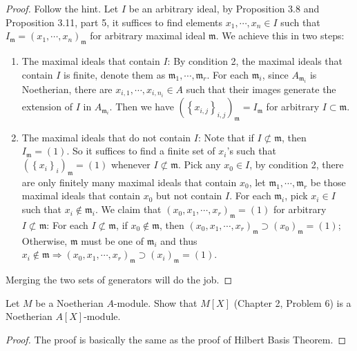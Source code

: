 \documentclass{solution}
\begin{document}
\begin{proof}
    Follow the hint. Let $I$ be an arbitrary ideal, by Proposition 3.8 and Proposition 3.11, part 5, it suffices to find elements $x_1, \cdots, x_n \in I$ such that $I_{\mathfrak{m}} = (x_1, \cdots, x_n)_{\mathfrak{m}}$ for arbitrary maximal ideal $\mathfrak{m}$. We achieve this in two steps:
    \begin{enumerate}
        \item The maximal ideals that contain $I$: By condition 2, the maximal ideals that contain $I$ is finite, denote them as $\mathfrak{m}_1, \cdots, \mathfrak{m}_r$. For each $\mathfrak{m}_i$, since $A_{\mathfrak{m}_i}$ is Noetherian, there are $x_{i, 1}, \cdots, x_{i, n_i} \in A$ such that their images generate the extension of $I$ in $A_{\mathfrak{m}_i}$. Then we have $(\left\lbrace x_{i, j} \right\rbrace_{i, j})_{\mathfrak{m}} = I_{\mathfrak{m}}$ for arbitrary $I \subset \mathfrak{m}$.
        \item The maximal ideals that do not contain $I$: Note that if $I \not \subset \mathfrak{m}$, then $I_{\mathfrak{m}} = (1)$. So it suffices to find a finite set of $x_i$'s such that $(\left\lbrace x_i \right\rbrace_i)_{\mathfrak{m}} = (1)$ whenever $I \not \subset \mathfrak{m}$. Pick any $x_0 \in I$, by condition 2, there are only finitely many maximal ideals that contain $x_0$, let $\mathfrak{m}_1, \cdots, \mathfrak{m}_r$ be those maximal ideals that contain $x_0$ but not contain $I$. For each $\mathfrak{m}_i$, pick $x_i \in I$ such that $x_i \notin \mathfrak{m}_i$. We claim that $(x_0, x_1, \cdots, x_r)_{\mathfrak{m}} = (1)$ for arbitrary $I \not \subset \mathfrak{m}$: For each $I \not \subset \mathfrak{m}$, if $x_0 \notin \mathfrak{m}$, then $(x_0, x_1, \cdots, x_r)_{\mathfrak{m}} \supset (x_0)_{\mathfrak{m}} = (1)$; Otherwise, $\mathfrak{m}$ must be one of $\mathfrak{m}_i$ and thus $x_i \notin \mathfrak{m} \Rightarrow (x_0, x_1, \cdots, x_r)_{\mathfrak{m}} \supset (x_i)_{\mathfrak{m}} = (1)$.
    \end{enumerate}
    Merging the two sets of generators will do the job.
\end{proof}

\begin{problem}
    Let $M$ be a Noetherian $A$-module. Show that $M[X]$ (Chapter 2, Problem 6) is a Noetherian $A[X]$-module.
\end{problem}

\begin{proof}
    The proof is basically the same as the proof of Hilbert Basis Theorem.
\end{proof}
\end{document}
